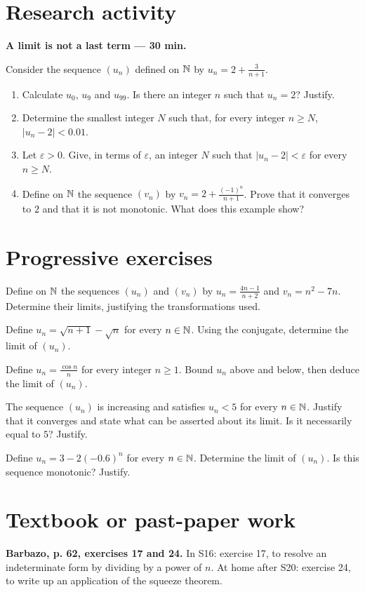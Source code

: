 \section{Research activity}\textbf{A limit is not a last term --- 30 min.}\par Consider the sequence $(u_n)$ defined on $\mathbb N$ by $u_n=2+\frac3{n+1}$.
\begin{enumerate}\item Calculate $u_0$, $u_9$ and $u_{99}$. Is there an integer $n$ such that $u_n=2$? Justify.
\item Determine the smallest integer $N$ such that, for every integer $n\ge N$, $|u_n-2|<0.01$.
\item Let $\varepsilon>0$. Give, in terms of $\varepsilon$, an integer $N$ such that $|u_n-2|<\varepsilon$ for every $n\ge N$.
\item Define on $\mathbb N$ the sequence $(v_n)$ by $v_n=2+\frac{(-1)^n}{n+1}$. Prove that it converges to $2$ and that it is not monotonic. What does this example show?\end{enumerate}

\section{Progressive exercises}

Define on $\mathbb N$ the sequences $(u_n)$ and $(v_n)$ by $u_n=\frac{4n-1}{n+2}$ and $v_n=n^2-7n$. Determine their limits, justifying the transformations used.

Define $u_n=\sqrt{n+1}-\sqrt n$ for every $n\in\mathbb N$. Using the conjugate, determine the limit of $(u_n)$.

Define $u_n=\frac{\cos n}{n}$ for every integer $n\ge1$. Bound $u_n$ above and below, then deduce the limit of $(u_n)$.

The sequence $(u_n)$ is increasing and satisfies $u_n<5$ for every $n\in\mathbb N$. Justify that it converges and state what can be asserted about its limit. Is it necessarily equal to $5$? Justify.

Define $u_n=3-2(-0.6)^n$ for every $n\in\mathbb N$. Determine the limit of $(u_n)$. Is this sequence monotonic? Justify.

\section{Textbook or past-paper work}\textbf{Barbazo, p. 62, exercises 17 and 24.} In S16: exercise 17, to resolve an indeterminate form by dividing by a power of $n$. At home after S20: exercise 24, to write up an application of the squeeze theorem.

